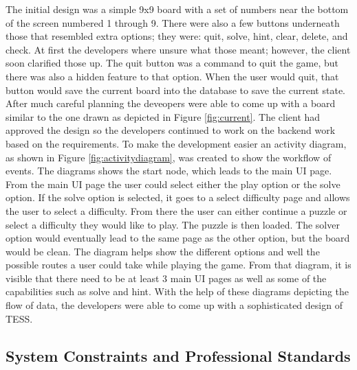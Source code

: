 \documentclass{article}
\begin{document}
The initial design was a simple 9x9 board with a set of numbers near the bottom of the screen numbered 1 through 9. There were also a few buttons underneath those that resembled extra options; they were: quit, solve, hint, clear, delete, and check. At first the developers where unsure what those meant; however, the client soon clarified those up. The quit button was a command to quit the game, but there was also a hidden feature to that option. When the user would quit, that button would save the current board into the database to save the current state. After much careful planning the deveopers were able to come up with a board similar to the one drawn as depicted in Figure \ref{fig:current}. The client had approved the design so the developers continued to work on the backend work based on the requirements. To make the development easier an activity diagram, as shown in Figure \ref{fig:activitydiagram}, was created to show the workflow of events. The diagrams shows the start node, which leads to the main UI page. From the main UI page the user could select either the play option or the solve option. If the solve option is selected, it goes to a select difficulty page and allows the user to select a difficulty. From there the user can either continue a puzzle or select a difficulty they would like to play. The puzzle is then loaded. The solver option would eventually lead to the same page as the other option, but the board would be clean. The diagram helps show the different options and well the possible routes a user could take while playing the game. From that diagram, it is visible that there need to be at least 3 main UI pages as well as some of the capabilities such as solve and hint. With the help of these diagrams depicting the flow of data, the developers were able to come up with a sophisticated design of TESS.

\subsection{System Constraints and Professional Standards}
\end{document}
